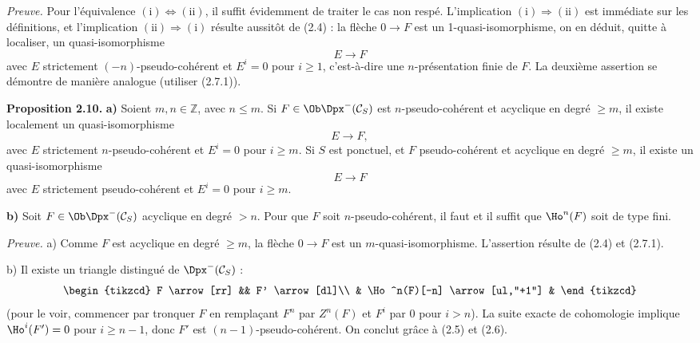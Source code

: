 \documentclass[11pt]{article}
\newcommand{\Spec}{\operatorname{Spec}}
\begin{document}
\emph{Preuve.} Pour l'équivalence \((\mathrm{i})\Leftrightarrow(\mathrm{ii})\), il suffit évidemment de traiter le cas non respé. L'implication \((\mathrm{i})\Rightarrow(\mathrm{ii})\) est immédiate sur les définitions, et l'implication \((\mathrm{ii})\Rightarrow(\mathrm{i})\) résulte aussitôt de (2.4) : la flèche \(0\to F\) est un 1-quasi-isomorphisme, on en déduit, quitte à localiser, un quasi-isomorphisme
\[
  E\longrightarrow F
\]
avec \(E\) strictement \((-n)\)-pseudo-cohérent et \(E^i=0\) pour \(i\geq 1\), c'est-à-dire une \(n\)-présentation finie de \(F\). La deuxième assertion se démontre de manière analogue (utiliser (2.7.1)).

\textbf{Proposition 2.10.} \textbf{a)} Soient \(m,n\in\mathbb Z\), avec \(n\leq m\). Si \(F\in\Ob\Dpx^-(\mathcal C_S)\) est \(n\)-pseudo-cohérent et acyclique en degré \(\geq m\), il existe localement un quasi-isomorphisme
\[
  E\longrightarrow F,
\]
avec \(E\) strictement \(n\)-pseudo-cohérent et \(E^i=0\) pour \(i\geq m\). Si \(S\) est ponctuel, et \(F\) pseudo-cohérent et acyclique en degré \(\geq m\), il existe un quasi-isomorphisme
\[
  E\longrightarrow F
\]
avec \(E\) strictement pseudo-cohérent et \(E^i=0\) pour \(i\geq m\).

\textbf{b)} Soit \(F\in\Ob\Dpx^-(\mathcal C_S)\) acyclique en degré \(>n\). Pour que \(F\) soit \(n\)-pseudo-cohérent, il faut et il suffit que \(\Ho^n(F)\) soit de type fini.

\emph{Preuve.} a) Comme \(F\) est acyclique en degré \(\geq m\), la flèche \(0\to F\) est un \(m\)-quasi-isomorphisme. L'assertion résulte de (2.4) et (2.7.1).

b) Il existe un triangle distingué de \(\Dpx^-(\mathcal C_S)\) :
\[
\begin{tikzcd}
F \arrow[rr] && F' \arrow[dl]\\
& \Ho^n(F)[-n] \arrow[ul,"+1"] &
\end{tikzcd}
\]
(pour le voir, commencer par tronquer \(F\) en remplaçant \(F^n\) par \(Z^n(F)\) et \(F^i\) par \(0\) pour \(i>n\)). La suite exacte de cohomologie implique \(\Ho^i(F')=0\) pour \(i\geq n-1\), donc \(F'\) est \((n-1)\)-pseudo-cohérent. On conclut grâce à (2.5) et (2.6).



\providecommand{\RHom}{\mathrm R\!\Hom}
\providecommand{\Ext}{\operatorname{Ext}}
\providecommand{\coh}{\operatorname{coh}}
\providecommand{\PreCoh}{\operatorname{precoh}}
\providecommand{\Tr}{\operatorname{Tr}}
\providecommand{\Qis}{\operatorname{Qis}}
\providecommand{\Rad}{\operatorname{rad}}
\providecommand{\Spec}{\operatorname{Spec}}
\providecommand{\End}{\operatorname{End}}
\providecommand{\Id}{\operatorname{Id}}
\providecommand{\varinjlim}{\mathop{\mathrm{lim}}\limits_{\longrightarrow}}
\providecommand{\varprojlim}{\mathop{\mathrm{lim}}\limits_{\longleftarrow}}
\providecommand{\qcoh}{\operatorname{qcoh}}
\providecommand{\amp}{\operatorname{amp}}
\end{document}
